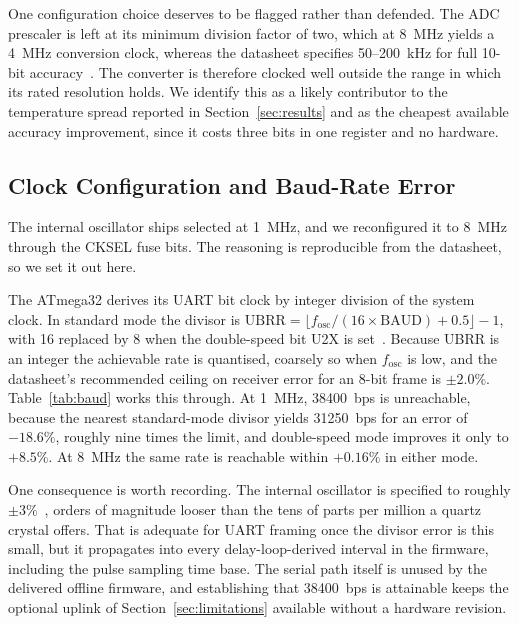 One configuration choice deserves to be flagged rather than defended. The ADC prescaler is left at
its minimum division factor of two, which at 8~MHz yields a 4~MHz conversion clock, whereas the
datasheet specifies 50--200~kHz for full 10-bit accuracy~\cite{microchip2020}. The converter is
therefore clocked well outside the range in which its rated resolution holds. We identify this as a
likely contributor to the temperature spread reported in Section~\ref{sec:results} and as the
cheapest available accuracy improvement, since it costs three bits in one register and no hardware.

\subsection{Clock Configuration and Baud-Rate Error}
\label{sec:calibration}
The internal oscillator ships selected at 1~MHz, and we reconfigured it to 8~MHz through the CKSEL
fuse bits. The reasoning is reproducible from the datasheet, so we set it out here.



The ATmega32 derives its UART bit clock by integer division of the system clock. In standard mode the
divisor is $\mathrm{UBRR} = \lfloor f_{\mathrm{osc}}/(16 \times \mathrm{BAUD}) + 0.5 \rfloor - 1$,
with 16 replaced by 8 when the double-speed bit U2X is set~\cite{microchip2020}. Because UBRR is an
integer the achievable rate is quantised, coarsely so when $f_{\mathrm{osc}}$ is low, and the
datasheet's recommended ceiling on receiver error for an 8-bit frame is $\pm 2.0\%$.
Table~\ref{tab:baud} works this through. At 1~MHz, 38400~bps is unreachable, because the nearest
standard-mode divisor yields 31250~bps for an error of $-18.6\%$, roughly nine times the limit, and
double-speed mode improves it only to $+8.5\%$. At 8~MHz the same rate is reachable within
$+0.16\%$ in either mode.

One consequence is worth recording. The internal oscillator is specified to roughly
$\pm 3\%$~\cite{microchip2020}, orders of magnitude looser than the tens of parts per million a quartz
crystal offers. That is adequate for UART framing once the divisor error is this small, but it
propagates into every delay-loop-derived interval in the firmware, including the pulse sampling time
base. The serial path itself is unused by the delivered offline firmware, and establishing that
38400~bps is attainable keeps the optional uplink of Section~\ref{sec:limitations} available without a
hardware revision.
